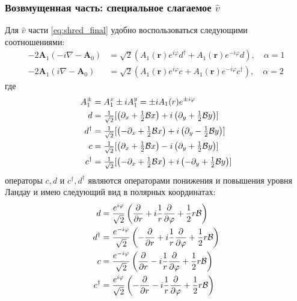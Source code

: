 \documentclass[a4paper,article,14pt]{extarticle}
\begin{document}
\subsubsection{Возвмущенная часть: специальное слагаемое $\hat v$}
Для  $\hat v$ части \eqref{eq:shred_final} удобно воспользоваться следующими соотношениями:
\begin{equation}
\begin{aligned}
-2 \mathbf{A}_1  (-i \nabla - \mathbf{A}_0 )& = \sqrt{2} \left( A_{1} (\mathbf{r}) e^{ i \varphi  } d^{\dagger} +  A_{1} (\mathbf{r}) e^{-i \varphi  } d \right), \quad \alpha = 1 \\
-2 \mathbf{A}_1  (i \nabla - \mathbf{A}_0 ) & = \sqrt{2} \left( A_{1} (\mathbf{r}) e^{  i \varphi  } c^{} +  A_{1} (\mathbf{r}) e^{-i \varphi  } c^{\dagger} \right) , \quad \alpha = 2
\end{aligned}
\end{equation}
где 
\begin{equation}
\begin{aligned}
A^{\pm}_{1}  & = A_{1}^{x} \pm i A_{1}^{y} = \pm i A_1 (r) e^{ \pm i \varphi  }    \\
d  & =  \tfrac{1}{\sqrt{2}} [  \left(\partial_{x} + \tfrac 12 {\cal B} x  \right) + i   \left(  \partial_{y} + \tfrac 12 {\cal B} y\right) ] \\
d^{\dagger}  & =  \tfrac{1}{\sqrt{2}} [ \left( - \partial_{x} + \tfrac 12 {\cal B} x \right) + i   \left( \partial_{y} - \tfrac 12 {\cal B} y  \right) ] \\
c  & =  \tfrac{1}{\sqrt{2}} [  \left(\partial_{x} + \tfrac 12 {\cal B} x  \right) - i   \left(  \partial_{y} + \tfrac 12 {\cal B} y\right) ] \\
c^{\dagger}  & =  \tfrac{1}{\sqrt{2}} [ \left( - \partial_{x} + \tfrac 12 {\cal B} x \right) + i   \left( - \partial_{y} + \tfrac 12 {\cal B} y  \right) ]
\end{aligned}
\end{equation} 
операторы $c,d$ и $c^{\dagger},d^{\dagger} $ являются операторами понижения и повышения уровня Ландау и имею следующий вид в полярных координатах:
\begin{equation}
\begin{aligned}
d &= \frac{e^{i \varphi}} {\sqrt{2}} \left(  \frac {\partial }{\partial r} + i \frac{1}{r}  \frac {\partial }{\partial \varphi} + \frac 1 2   r \cal B  \right) \\
d^{\dagger} &= \frac{e^{ -i \varphi}} {\sqrt{2}} \left(  - \frac {\partial }{\partial r} + i \frac{1}{r}  \frac {\partial }{\partial \varphi} + \frac 1 2    r \cal B \right) \\
c &= \frac{e^{- i \varphi}} {\sqrt{2}} \left(  \frac {\partial }{\partial r} - i \frac{1}{r}  \frac {\partial }{\partial \varphi} + \frac 1 2   r \cal B  \right) \\
c^{\dagger} &= \frac{e^{ i \varphi}} {\sqrt{2}} \left(  - \frac {\partial }{\partial r} - i \frac{1}{r}  \frac {\partial }{\partial \varphi} + \frac 1 2    r \cal B \right) \\
\end{aligned}
\end{equation}
\end{document}
